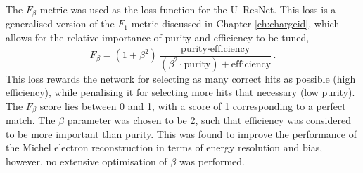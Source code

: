The $F_\beta$ metric\cite{VanRijsbergenC.J.1975Ir} was used as the loss
function for the U--ResNet. This loss is a generalised version of the $F_1$
metric discussed in Chapter \ref{ch:chargeid}, which allows for the relative
importance of purity and efficiency to be tuned,
\begin{equation*}
	F_\beta = \left( 1 + \beta^2\right) \frac{\mbox{purity} \cdot
	\mbox{efficiency}}{\left(\beta^2 \cdot \mbox{purity}\right) +
	\mbox{efficiency}}.
\end{equation*}
This loss rewards the network for selecting as many correct hits as possible
(high efficiency), while penalising it for selecting more hits that necessary 
(low purity). The $F_\beta$ score lies between 0 and 1, with a score of 1 
corresponding to a perfect match. The $\beta$ parameter was chosen to be 2, 
such that efficiency was considered to be more important than purity. This was 
found to improve the performance of the Michel electron reconstruction in terms 
of energy resolution and bias, however, no extensive optimisation of $\beta$ was
performed.

